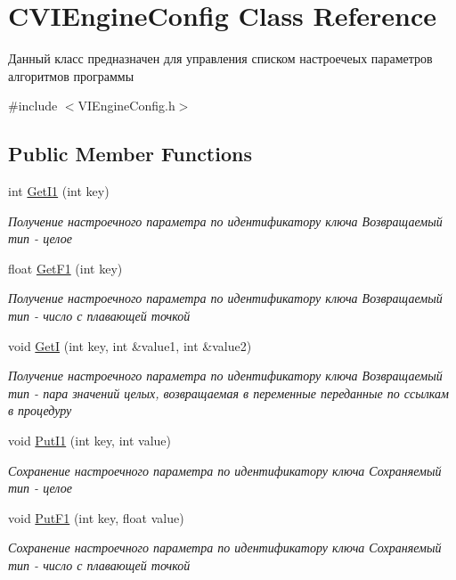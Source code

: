 \hypertarget{class_c_v_i_engine_config}{\section{C\+V\+I\+Engine\+Config Class Reference}
\label{class_c_v_i_engine_config}
}


Данный класс предназначен для управления списком настроечеых параметров алгоритмов программы  




{\ttfamily \#include $<$V\+I\+Engine\+Config.\+h$>$}

\subsection*{Public Member Functions}
\begin{DoxyCompactItemize}
\item 
int \hyperlink{class_c_v_i_engine_config_a41be84d81a153f85554171555094f20d}{Get\+I1} (int key)
\begin{DoxyCompactList}\small\item\em Получение настроечного параметра по идентификатору ключа Возвращаемый тип -\/ целое \end{DoxyCompactList}\item 
float \hyperlink{class_c_v_i_engine_config_a1f474cfcfadee9f76567fc84a10c5ad9}{Get\+F1} (int key)
\begin{DoxyCompactList}\small\item\em Получение настроечного параметра по идентификатору ключа Возвращаемый тип -\/ число с плавающей точкой \end{DoxyCompactList}\item 
void \hyperlink{class_c_v_i_engine_config_ac32483113b3f4cff0fb2dbbe2f00f420}{Get\+I} (int key, int \&value1, int \&value2)
\begin{DoxyCompactList}\small\item\em Получение настроечного параметра по идентификатору ключа Возвращаемый тип -\/ пара значений целых, возвращаемая в переменные переданные по ссылкам в процедуру \end{DoxyCompactList}\item 
void \hyperlink{class_c_v_i_engine_config_a5a4a7b7c7a9c1152998eabddf2ed020d}{Put\+I1} (int key, int value)
\begin{DoxyCompactList}\small\item\em Сохранение настроечного параметра по идентификатору ключа Сохраняемый тип -\/ целое \end{DoxyCompactList}\item 
void \hyperlink{class_c_v_i_engine_config_a6ac9297ee130cbf9b4d44bf812b3dd89}{Put\+F1} (int key, float value)
\begin{DoxyCompactList}\small\item\em Сохранение настроечного параметра по идентификатору ключа Сохраняемый тип -\/ число с плавающей точкой \end{DoxyCompactList}\end{DoxyCompactItemize}


